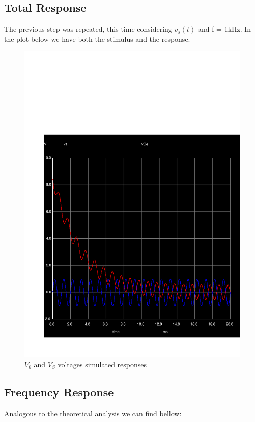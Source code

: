 \subsection{Total Response}

The previous step was repeated, this time considering $v_s(t)$ and f = 1kHz. In the plot below we have both the stimulus and the response.

\begin{figure}[!h]
	\centering
	\includegraphics[width=0.7\linewidth]{../sim/total.pdf}
	\caption{$V_6$ and $V_S$ voltages simulated responses}
\end{figure}


\subsection{Frequency Response}

Analogous to the theoretical analysis we can find bellow:

